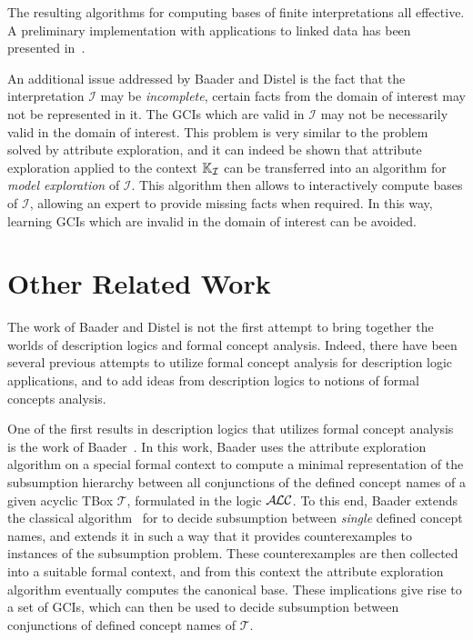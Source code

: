 The resulting algorithms for computing bases of finite interpretations all effective.  A
preliminary implementation with applications to linked data has been presented
in~\cite{DBLP:conf/icdm/BorchmannD11}.

An additional issue addressed by Baader and Distel is the fact that the interpretation
$\mathcal{I}$ may be \emph{incomplete}, \ie certain facts from the domain of interest may
not be represented in it.  The GCIs which are valid in $\mathcal{I}$ may not be
necessarily valid in the domain of interest.  This problem is very similar to the problem
solved by attribute exploration, and it can indeed be shown that attribute exploration
applied to the context ${\mathbb{K}}_{\mathcal{I}}$ can be transferred into an algorithm for
\emph{model exploration} of $\mathcal{I}$.  This algorithm then allows to interactively
compute bases of $\mathcal{I}$, allowing an expert to provide missing facts when required.
In this way, learning GCIs which are invalid in the domain of interest can be avoided.

\section{Other Related Work}
\label{sec:related-work}

The work of Baader and Distel is not the first attempt to bring together the worlds of
description logics and formal concept analysis.  Indeed, there have been several previous
attempts to utilize formal concept analysis for description logic applications, and to add
ideas from description logics to notions of formal concepts analysis.

One of the first results in description logics that utilizes formal concept analysis is
the work of Baader~\cite{Baader-KRUSE-95}.  In this work, Baader uses the attribute
exploration algorithm on a special formal context to compute a minimal representation of
the subsumption hierarchy between all conjunctions of the defined concept names of a given
acyclic TBox $\mathcal{T}$, formulated in the logic $\mathcal{A}\kern-0.05em\mathcal{L}\mathcal{C}$.  To this end, Baader extends
the classical algorithm~\cite{journals/ai/Schmidt-SchaussS91} for \ALC to decide
subsumption between \emph{single} defined concept names, and extends it in such a way that
it provides counterexamples to instances of the subsumption problem.  These
counterexamples are then collected into a suitable formal context, and from this context
the attribute exploration algorithm eventually computes the canonical base.  These
implications give rise to a set of GCIs, which can then be used to decide subsumption
between conjunctions of defined concept names of $\mathcal{T}$.

